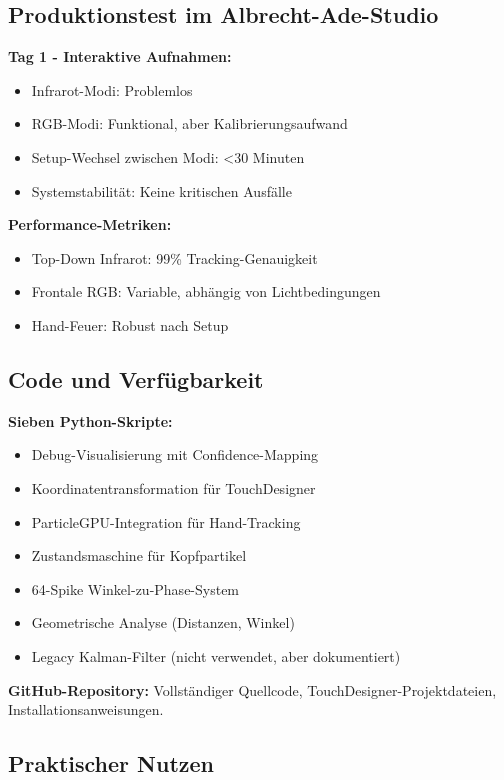 \subsection{Produktionstest im Albrecht-Ade-Studio}

\textbf{Tag 1 - Interaktive Aufnahmen:}
\begin{itemize}
    \item Infrarot-Modi: Problemlos
    \item RGB-Modi: Funktional, aber Kalibrierungsaufwand
    \item Setup-Wechsel zwischen Modi: <30 Minuten
    \item Systemstabilität: Keine kritischen Ausfälle
\end{itemize}

\textbf{Performance-Metriken:}
\begin{itemize}
    \item Top-Down Infrarot: 99\% Tracking-Genauigkeit
    \item Frontale RGB: Variable, abhängig von Lichtbedingungen
    \item Hand-Feuer: Robust nach Setup
\end{itemize}

\subsection{Code und Verfügbarkeit}

\textbf{Sieben Python-Skripte:}
\begin{itemize}
    \item Debug-Visualisierung mit Confidence-Mapping
    \item Koordinatentransformation für TouchDesigner
    \item ParticleGPU-Integration für Hand-Tracking
    \item Zustandsmaschine für Kopfpartikel
    \item 64-Spike Winkel-zu-Phase-System
    \item Geometrische Analyse (Distanzen, Winkel)
    \item Legacy Kalman-Filter (nicht verwendet, aber dokumentiert)
\end{itemize}

\textbf{GitHub-Repository:} Vollständiger Quellcode, TouchDesigner-Projektdateien, Installationsanweisungen.

\subsection{Praktischer Nutzen}

